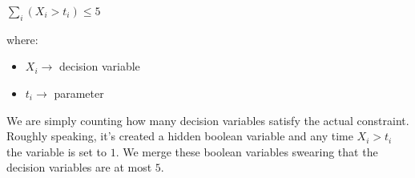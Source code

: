 \begin{example}[title = Intensional constraints examples]
\begin{itemize}
        \begin{center}
            $\sum_{i}(X_i > t_i) \leq 5$ \vspace{1.5pt}
        \end{center} \vspace{1.5pt}
        where:
        \begin{itemize}
            \renewcommand{\labelitemi}{}
            \item $X_i \rightarrow$ decision variable
            \item $t_i \rightarrow$ parameter
        \end{itemize} \vspace{1.5pt}
        We are simply counting how many decision variables satisfy the actual constraint. Roughly speaking, it's created a hidden boolean variable and any time $X_i > t_i$ the variable is set to $1$. We merge these boolean variables swearing that the decision variables are at most $5$.
    \end{itemize}
\end{example}